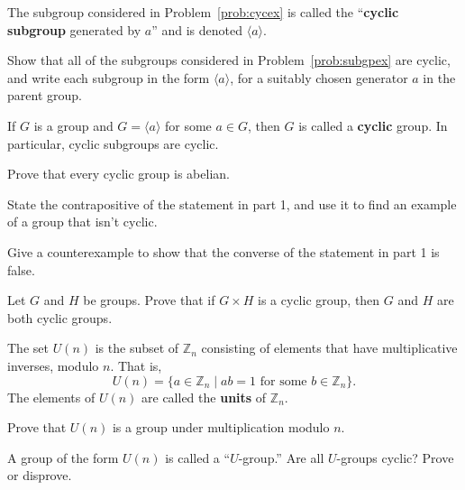 \begin{definition}\label{def:cyclicgroup}
The subgroup considered in Problem~\ref{prob:cycex}  is called the ``\textbf{cyclic subgroup} generated by \(a\)'' and is denoted \(\langle a \rangle \).
\end{definition}

\begin{problem}
Show that all of the subgroups considered in Problem~\ref{prob:subgpex} are cyclic, and write each subgroup in the form \(\langle a\rangle\), for a suitably chosen generator \(a\) in the parent group.
\end{problem}

\begin{definition}
If \(G\) is a group and \(G = \langle a \rangle\) for some \(a \in G\), then \(G\) is called a \textbf{cyclic} group. In particular, cyclic subgroups are cyclic.
\end{definition}

\begin{problem}
    \mbox{}
\begin{problemparts}
  \item Prove that every cyclic group is abelian.
  \item State the contrapositive of the statement in part 1, and use it to find an example of a group that isn't cyclic.
  \item Give a counterexample to show that the converse of the statement in part 1 is false.
\end{problemparts}
\end{problem}

\begin{problem}
Let \(G\) and \(H\) be groups. Prove that if \(G\times H\) is a cyclic group, then \(G\) and \(H\) are both cyclic groups.
\end{problem}

\begin{definition}
The set \(U(n)\) is the subset of \(\mathbb{Z}_n\) consisting of elements that have multiplicative inverses, modulo \(n\). That is, \[U(n) = \{a \in \mathbb{Z}_n \mid ab = 1 \mbox{ for some } b \in \mathbb{Z}_n \}. \]
The elements of \(U(n)\) are called the \textbf{units} of \(\mathbb{Z}_n\).
\end{definition}

\begin{problem}
    \mbox{}
\begin{problemparts}
  \item Prove that \(U(n)\) is a group under multiplication modulo \(n\).
  \item A group of the form \(U(n)\) is called a ``\(U\)-group.'' Are all \(U\)-groups cyclic? Prove or disprove.
\end{problemparts}
\end{problem}

